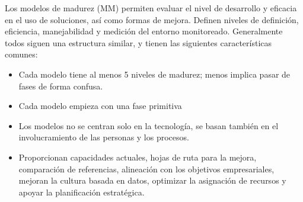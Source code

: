 Los modelos de madurez (MM) permiten evaluar el nivel de desarrollo y eficacia en el uso de soluciones, así como formas de mejora. Definen niveles de definición, eficiencia, manejabilidad y medición del entorno monitoreado. Generalmente todos siguen una estructura similar, y tienen las siguientes características comunes: 
\begin{itemize}
\item Cada modelo tiene al menos 5 niveles de madurez; menos implica pasar de fases de forma confusa. 
\item Cada modelo empieza con una fase primitiva
\item Los modelos no se centran solo en la tecnología, se basan también en el involucramiento de las personas y los procesos.
\item Proporcionan capacidades actuales, hojas de ruta para la mejora, comparación de referencias, alineación con los objetivos empresariales, mejoran la cultura basada en datos, optimizar la asignación de recursos y apoyar la planificación estratégica.
\end{itemize}

